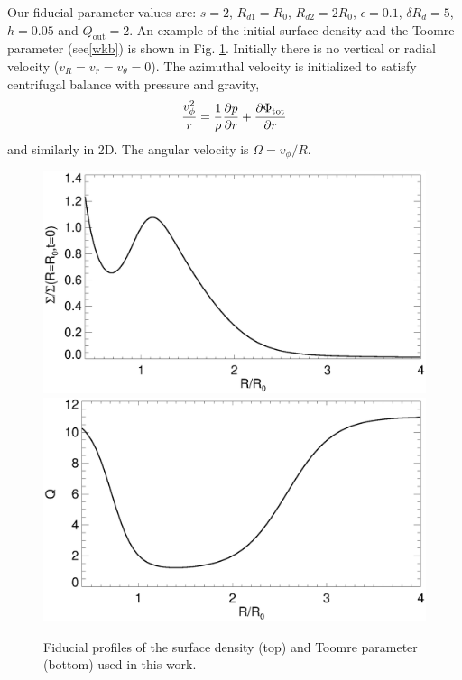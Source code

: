 Our fiducial parameter values are: $s=2$, $R_{d1}=R_0$, $R_{d2}=2R_0$,
$\epsilon=0.1$, $\delta R_d=5$, $h=0.05$ and
$Q_\mathrm{out}=2$. An example of the initial surface density and the
Toomre parameter (see\ref{wkb}) is shown in Fig. \ref{initial_surf}. 
Initially there is no vertical or radial velocity
($v_R = v_r = v_\theta = 0$). The azimuthal velocity is initialized to
satisfy centrifugal balance with pressure and gravity,
\begin{align}
  \frac{v_\phi^2}{r} = \frac{1}{\rho}\frac{\partial p}{\partial r} + \frac{\partial
    \Phi_\mathrm{tot}}{\partial r}
\end{align}
and similarly in 2D. The angular velocity is $\Omega = v_\phi/R$. 


\begin{figure}
  \includegraphics[width=\linewidth,clip=true,trim=0cm 1.7cm 0cm
  0cm]{figures/compare_profiles_dens000} 
  \includegraphics[width=\linewidth]{figures/compare_profiles_Q000}
  \caption{Fiducial profiles of the surface density (top) and Toomre
    parameter (bottom) used in this work.\label{initial_surf}}
\end{figure}


